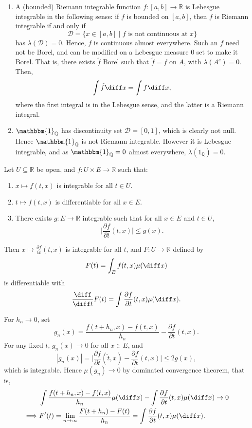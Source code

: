 \documentclass[12pt]{article}
\begin{document}
\begin{enumerate}[resume*]
	\item A (bounded) Riemann integrable function $f : [a, b] \to \mathbb{R}$ is Lebesgue integrable in the following sense: if $f$ is bounded on $[a, b]$, then $f$ is Riemann integrable if and only if
		\[
			\mathcal{D} = \{ x \in [a, b] \mid f \text{ is not continuous at } x\}
		\]
		has $\lambda(\mathcal{D}) = 0$. Hence, $f$ is continuous almost everywhere. Such an $f$ need not be Borel, and can be modified on a Lebesgue measure $0$ set to make it Borel. That is, there exists $\tilde f$ Borel such that $\tilde f = f$ on $A$, with $\lambda(A^{c}) = 0$. Then,
		\[
		\int \tilde f \diff x = \int f \diff x,
		\]
		where the first integral is in the Lebesgue sense, and the latter is a Riemann integral.
	\item $\mathbbm{1}_{\mathbb{Q}}$ has discontinuity set $\mathcal{D} = [0, 1]$, which is clearly not null. Hence $\mathbbm{1}_{\mathbb{Q}}$ is not Riemann integrable. However it is Lebesgue integrable, and as $\mathbbm{1}_{\mathbb{Q}} = 0$ almost everywhere, $\lambda(1_{\mathbb{Q}}) = 0$.
\end{enumerate}

\begin{theorem}
	Let $U \subseteq \mathbb{R}$ be open, and $f : U \times E \to \mathbb{R}$ such that:
	\begin{enumerate}[\normalfont(i)]
		\item $x \mapsto f(t, x)$ is integrable for all $t \in U$.
		\item $t \mapsto f(t, x)$ is differentiable for all $x \in E$.
		\item There exists $g : E \to \mathbb{R}$ integrable such that for all $x \in E$ and $t \in U$,
			\[
			\biggl| \frac{\partial f}{\partial t}(t, x) \biggr| \leq g(x).
			\]
	\end{enumerate}
		Then $x \mapsto \frac{\partial f}{\partial t}(t, x)$ is integrable for all $t$, and $F : U \to \mathbb{R}$ defined by
		\[
		F(t) = \int_E f(t, x) \mu(\diff x)
		\]
		is differentiable with
		\[
		\frac{\diff}{\diff t} F(t) = \int \frac{\partial f}{\partial t}(t, x) \mu(\diff x).
		\]
\end{theorem}

\begin{proofbox}
	For $h_n \to 0$, set
	\[
	g_n(x) = \frac{f(t+h_n,x) - f(t, x)}{h_n} - \frac{\partial f}{\partial t}(t, x).
	\]
	For any fixed $t$, $g_n(x) \to 0$ for all $x \in E$, and
	\[
	|g_n(x)| = \biggl| \frac{\partial f}{\partial t}(\tilde t, x) - \frac{\partial f}{\partial t}(t, x) \biggr| \leq 2 g(x),
	\]
	which is integrable. Hence $\mu(g_n) \to 0$ by dominated convergence theorem, that is,
	\begin{align*}
		&\int \frac{f(t+h_n, x) - f(t, x)}{h_n} \mu(\diff x) - \int \frac{\partial f}{\partial t}(t, x) \mu(\diff x) \to 0 \\
		\implies & F'(t) = \lim_{n \to \infty} \frac{F(t+h_n) - F(t)}{h_n} = \int \frac{\partial f}{\partial t}(t, x) \mu(\diff x).
	\end{align*}
\end{proofbox}
\end{document}
